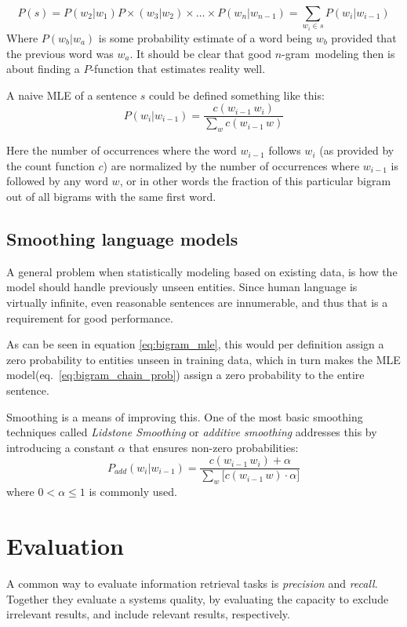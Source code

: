 \documentclass[a4paper,11pt]{kth-mag}
\newcommand{\ngram}{$n$-gram}
\begin{document}
\begin{equation} \label{eq:bigram_chain_prob}
P(s) = P(w_2 | w_1)P\times (w_3 | w_2) \times \dots \times P(w_n | w_{n-1}) = \sum_{w_i \in s}P(w_i|w_{i-1})
\end{equation}
Where $P(w_b | w_a)$ is some probability estimate of a word being $w_b$ provided that the previous word was $w_a$. It should be clear that good \ngram~modeling then is about finding a $P$-function that estimates reality well.

A naive \gls{MLE} of a sentence $s$ could be defined something like this:
\begin{equation} \label{eq:bigram_mle}
P(w_i|w_{i-1}) = \frac{c(w_{i-1}\,w_i)}{\sum_{w} c(w_{i-1}\, w)}
\end{equation}

Here the number of occurrences where the word $w_{i-1}$ follows $w_i$ (as provided by the count function $c$) are normalized by the number of occurrences where $w_{i-1}$ is followed by any word $w$, or in other words the fraction of this particular bigram out of all bigrams with the same first word.

\subsection{Smoothing language models}
A general problem when statistically modeling based on existing data, is how the model should handle previously unseen entities. Since human language is virtually infinite, even reasonable sentences are innumerable, and thus that is a requirement for good performance.

As can be seen in equation \ref{eq:bigram_mle}, this would per definition assign a zero probability to entities unseen in training data, which in turn makes the \gls{MLE} model(eq.~\ref{eq:bigram_chain_prob}) assign a zero probability to the entire sentence\cite{chen_goodman}.

Smoothing is a means of improving this. One of the most basic smoothing techniques called \emph{Lidstone Smoothing} or \emph{additive smoothing} addresses this by introducing a constant $\alpha$ that ensures non-zero probabilities\cite{chen_goodman}:
\begin{equation} \label{eq:additive_smoothing}
P_{add}(w_i|w_{i-1}) = \frac{c(w_{i-1}\,w_i)+\alpha}{\sum_{w} \big[c(w_{i-1}\, w)\cdot\alpha\big]}
\end{equation}
where $0 < \alpha \leq 1$ is commonly used.

\section{Evaluation}
A common way to evaluate information retrieval tasks is \emph{precision} and \emph{recall}. Together they evaluate a systems quality, by evaluating the capacity to exclude irrelevant results, and include relevant results, respectively.
\end{document}
